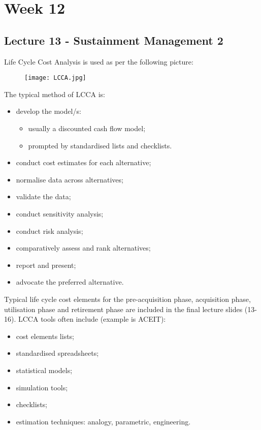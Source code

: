 \documentclass[journal]{IEEEtran}
\begin{document}
\section{Week 12}
\subsection{Lecture 13 - Sustainment Management 2}
Life Cycle Cost Analysis is used as per the following picture:
	\begin{figure}[h]
		\hfill\texttt{[image: LCCA.jpg]}\hspace*{\fill}
	\end{figure}
The typical method of LCCA is:
\begin{itemize}
	\item develop the model/s:
	\begin{itemize}
		\item usually a discounted cash flow model;
		\item prompted by standardised lists and checklists.
	\end{itemize}
	\item conduct cost estimates for each alternative;
	\item normalise data across alternatives;
	\item validate the data;
	\item conduct sensitivity analysis;
	\item conduct risk analysis;
	\item comparatively assess and rank alternatives;
	\item report and present;
	\item advocate the preferred alternative.
\end{itemize}
Typical life cycle cost elements for the pre-acquisition phase, acquisition phase, utilisation phase and retirement phase are included in the final lecture slides (13-16).
LCCA tools often include (example is ACEIT):
\begin{itemize}
	\item cost elements lists;
	\item standardised spreadsheets;
	\item statistical models;
	\item simulation tools;
	\item checklists;
	\item estimation techniques: analogy, parametric, engineering.
\end{itemize}
\end{document}
